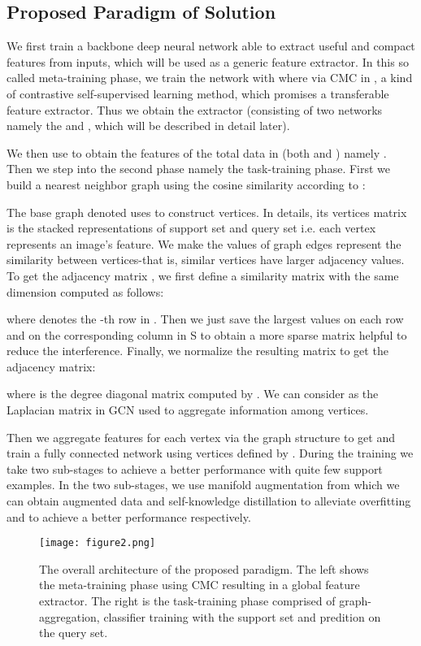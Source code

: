\documentclass[conference]{IEEEtran}
\begin{document}
\subsection{Proposed Paradigm of Solution}\label{3.2}
We first train a backbone deep neural network able to extract useful and compact features from inputs, which will be used as a generic feature extractor. In this so called meta-training phase, we train the network with   where  via CMC in \cite{tian2019contrastive}, a kind of contrastive self-supervised learning method,  which promises a transferable feature extractor. Thus we obtain the extractor  (consisting of two networks namely the   and , which will be described in detail later). 

We then use  to obtain the features of the total data in  (both  and ) namely . Then we step into the second phase namely the task-training phase. First we build a nearest neighbor graph using the cosine similarity according to \cite{hu2020exploiting} :

The base graph denoted  uses  to construct vertices. In details, its vertices matrix  is the stacked representations of support set and query set i.e. each vertex represents an image's feature. We make the values of graph edges represent the similarity between vertices-that is, similar vertices have larger adjacency values. To get the adjacency matrix , we first define a similarity matrix  with the same dimension computed as follows:

where  denotes the  -th row in . Then we just save the  largest values on each row and on the corresponding column in S to obtain a more sparse matrix helpful to reduce the interference. Finally, we normalize the resulting matrix to get the adjacency matrix:

where  is the degree diagonal matrix computed by . We can consider  as the Laplacian matrix in GCN\cite{kipf2016semi} used to aggregate information among vertices. 


Then we aggregate features for each vertex via the graph structure to get  and train a fully connected network  using vertices defined by . During the training we take two sub-stages to achieve a better performance with quite few support examples. In the two sub-stages, we use manifold augmentation from which we can obtain augmented data  and self-knowledge distillation to alleviate overfitting and to achieve a better performance respectively. 

\begin{figure*}[htbp]
\centering
\texttt{[image: figure2.png]}
\caption{The overall architecture of the proposed paradigm. The left shows the meta-training phase using CMC resulting in a global feature extractor. The right is the task-training phase comprised of graph-aggregation, classifier training with the support set and predition on the query set.}
\label{fig2}
\end{figure*}
\end{document}
